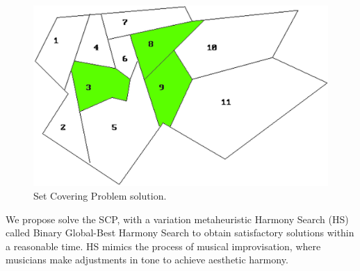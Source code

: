\squeezeup
\begin{figure}[H]%
	\begin{center}
		\includegraphics[scale=0.35]{Introduccion/imagenes/SetCoveringSolved.png}%
		\caption{Set Covering Problem solution.}\label{fig:SetCovering2}
	\end{center}	
\end{figure}
\squeezeup



We propose solve the SCP, with a variation metaheuristic Harmony Search (HS) called Binary Global-Best Harmony Search to obtain satisfactory solutions within a reasonable time. HS mimics the process of musical improvisation, where musicians make adjustments in tone to achieve aesthetic harmony.